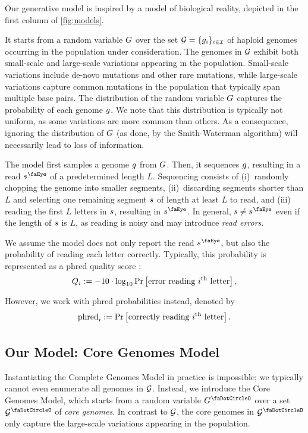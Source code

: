 Our generative model is inspired by a model of biological reality, depicted in the first column of \cref{fig:models}.

It starts from a random variable $G$ over the set $\mathcal{G} = \{g_i\}_{i \in \mathcal{I}}$ of haploid genomes occurring in the population under consideration.
The genomes in $\mathcal{G}$ exhibit both small-scale and large-scale variations appearing in the population.
Small-scale variations include de-novo mutations and other rare mutations, while large-scale variations capture common mutations in the population that typically span multiple base pairs.
The distribution of the random variable $G$ captures the probability of each genome $g$.
We note that this distribution is typically not uniform, as some variations are more common than others.
As a consequence, ignoring the distribution of $G$ (as done, \eg by the Smith-Waterman algorithm) will necessarily lead to loss of information.

The model first samples a genome $g$ from $G$.
Then, it sequences $g$, resulting in a read $\segment^\gread$ of a predetermined length $L$.
Sequencing consists of (i)~randomly chopping the genome into smaller segments, (ii)~discarding segments shorter than $L$ and selecting one remaining segment $s$ of length at least $L$ to read, and (iii) reading the first $L$ letters in $s$, resulting in $\segment^\gread$.
In general, $\segment \neq \segment^\gread$ even if the length of $s$ is $L$, as reading is noisy and may introduce \emph{read errors}.

We assume the model does not only report the read $\segment^\gread$, but also the probability of reading each letter correctly.
Typically, this probability is represented as a phred quality score \cite{ewing_base-calling_1998}:
$$Q_i := -10 \cdot \log_{10}\Pr{\text{error reading \nth{i} letter}},$$
However, we work with phred probabilities instead, denoted by
$$
\pphred{i} := \Pr{\text{correctly reading \nth{i} letter}}.
$$


\subsection{Our Model: Core Genomes Model} \label{sec:generative-model}
Instantiating the Complete Genomes Model in practice is impossible; we typically cannot even enumerate all genomes in $\mathcal{G}$.
Instead, we introduce the Core Genomes Model, which starts from a random variable $\genomeRV^\gcore$ over a set $\genomes^\gcore$ of \emph{core genomes}.
In contrast to $\mathcal{G}$, the core genomes in $\genomes^\gcore$ only capture the large-scale variations appearing in the population.

